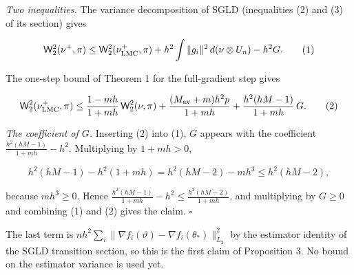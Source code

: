 \documentclass[11pt,a4paper]{report}
\begin{document}
\emph{Two inequalities.} The variance decomposition of SGLD (inequalities (2) and (3) of its section) gives


\[\mathsf W_2^2(\nu^+,\pi)\le\mathsf W_2^2(\nu^+_{\rm LMC},\pi)+h^2\int\|g_i\|^2\,d(\nu\otimes U_n)-h^2G.\qquad(1)\]


The one-step bound of Theorem 1 for the full-gradient step gives


\[\mathsf W_2^2(\nu^+_{\rm LMC},\pi)\le\frac{1-mh}{1+mh}\,\mathsf W_2^2(\nu,\pi)+\frac{(M_{\rm av}+m)h^2p}{1+mh}+\frac{h^2(hM-1)}{1+mh}\,G.\qquad(2)\]


\emph{The coefficient of \(G\).} Inserting (2) into (1), \(G\) appears with the coefficient \(\frac{h^2(hM-1)}{1+mh}-h^2\). Multiplying by \(1+mh>0\),


\[h^2(hM-1)-h^2(1+mh)=h^2(hM-2)-mh^3\le h^2(hM-2),\]


because \(mh^3\ge0\). Hence \(\frac{h^2(hM-1)}{1+mh}-h^2\le\frac{h^2(hM-2)}{1+mh}\), and multiplying by \(G\ge0\) and combining (1) and (2) gives the claim. \(\square\)




The last term is \(nh^2\sum_i\|\nabla f_i(\vartheta)-\nabla f_i(\theta_*)\|_{L_2}^2\) by the estimator identity of the SGLD transition section, so this is the first claim of Proposition 3. No bound on the estimator variance is used yet.
\end{document}
